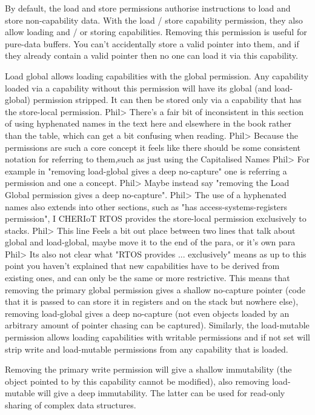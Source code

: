 By default, the load and store permissions authorise instructions to load and store non-capability data.
With the load / store capability permission, they also allow loading and / or storing capabilities.
Removing this permission is useful for pure-data buffers.
You can't accidentally store a valid pointer into them, and if they already contain a valid pointer then no one can load it via this capability. 

Load global allows loading capabilities with the global permission.
Any capability loaded via a capability without this permission will have its global (and load-global) permission stripped.
It can then be stored only via a capability that has the store-local permission.
Phil> There's a fair bit of inconsistent in this section of using hyphenated names in the text here and elsewhere in the book rather than the table, which can get a bit confusing when reading.
Phil> Because the permissions are such a core concept it feels like there should be some consistent notation for referring to them,such as just using the Capitalised Names    
Phil> For example in "removing load-global gives a deep no-capture" one is referring a permission and one a concept.
Phil> Maybe instead say "removing the Load Global permission gives a deep no-capture".
Phil> The use of a hyphenated names also extends into other sections, such as "has access-systems-registers permission", I  
CHERIoT RTOS provides the store-local permission exclusively to stacks.
Phil> This line Feels a bit out place between two lines that talk about global and load-global, maybe move it to the end of the para, or it's own para  
Phil> Its also not clear what "RTOS provides ... exclusively" means as up to this point you haven't explained that new capabilities have to be derived from existing ones, and can only be the same or more restrictive.
This means that removing the primary global permission gives a shallow no-capture pointer (code that it is passed to can store it in registers and on the stack but nowhere else), removing load-global gives a deep no-capture (not even objects loaded by an arbitrary amount of pointer chasing can be captured).
Similarly, the load-mutable permission allows loading capabilities with writable permissions and if not set will strip write and load-mutable permissions from any capability that is loaded.

Removing the primary write permission will give a shallow immutability (the object pointed to by this capability cannot be modified), also removing load-mutable will give a deep immutability.
The latter can be used for read-only sharing of complex data structures.

